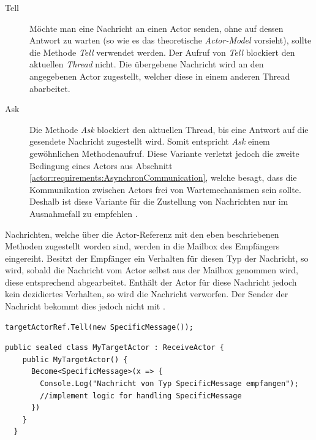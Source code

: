 \begin{description}
  \item[Tell] Möchte man eine Nachricht an einen Actor senden, ohne auf dessen Antwort zu warten (so wie es das theoretische \textit{ Actor-Model} vorsieht), sollte die Methode \textit{Tell} verwendet werden. Der Aufruf von \textit{Tell} blockiert den aktuellen \textit{Thread} nicht. Die übergebene Nachricht wird an den angegebenen Actor zugestellt, welcher diese in einem anderen Thread abarbeitet. 
  \item[Ask] Die Methode \textit{Ask} blockiert den aktuellen Thread, bis eine Antwort auf die gesendete Nachricht zugestellt wird. Somit entspricht \textit{Ask} einem gewöhnlichen Methodenaufruf. Diese Variante verletzt jedoch die zweite Bedingung eines Actors aus Abschnitt \ref{actor:requirements:AsynchronCommunication}, welche besagt, dass die Kommunikation zwischen Actors frei von Wartemechanismen sein sollte. Deshalb ist diese Variante für die Zustellung von Nachrichten nur im Ausnahmefall zu empfehlen \citep{Akka.NETCommunityAkka.NETDocumentation}. 
\end{description}
Nachrichten, welche über die Actor-Referenz mit den eben beschriebenen Methoden zugestellt worden sind, werden in die Mailbox des Empfängers eingereiht. Besitzt der Empfänger ein Verhalten für diesen Typ der Nachricht, so wird, sobald die Nachricht vom Actor selbst aus der Mailbox genommen wird, diese entsprechend abgearbeitet. Enthält der Actor für diese Nachricht jedoch kein de­zi­diertes Verhalten, so wird die Nachricht verworfen. Der Sender der Nachricht bekommt dies jedoch nicht mit \citep{akkaInAction}. \\

\begin{lstlisting}[caption=Versenden einer Nachricht an einen anderen Actor, label=code:actor:TellMethod]
  targetActorRef.Tell(new SpecificMessage());
\end{lstlisting}

\begin{lstlisting}[caption=Hier wird für den Actor \textit{MyTargetActor} das Verhalten für eine einkommende Nachricht vom Typ \textit{SpecificMessage} festgelegt., label=lst:test]
  public sealed class MyTargetActor : ReceiveActor {
    public MyTargetActor() {
      Become<SpecificMessage>(x => {
        Console.Log("Nachricht von Typ SpecificMessage empfangen");
        //implement logic for handling SpecificMessage
      })
    }
  }  
\end{lstlisting}

